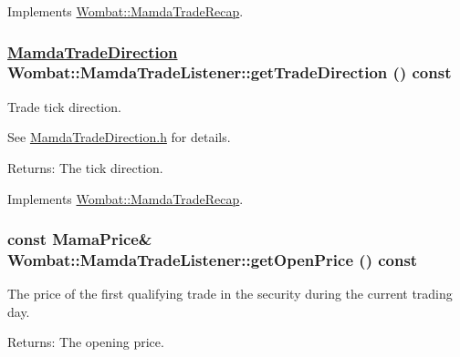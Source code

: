 Implements \hyperlink{classWombat_1_1MamdaTradeRecap_05f9cfbfd50d3783a2d5716064ed7b9f}{Wombat::Mamda\-Trade\-Recap}.\hypertarget{classWombat_1_1MamdaTradeListener_1acaaeffe975eb7f5a9541703ca49f7e}{
\subsubsection[getTradeDirection]{\setlength{\rightskip}{0pt plus 5cm}\hyperlink{namespaceWombat_d2479765bb418204c8ccfd3785d2bdbe}{Mamda\-Trade\-Direction} Wombat::Mamda\-Trade\-Listener::get\-Trade\-Direction () const}}
\label{classWombat_1_1MamdaTradeListener_1acaaeffe975eb7f5a9541703ca49f7e}


Trade tick direction. 

See \hyperlink{MamdaTradeDirection_8h}{Mamda\-Trade\-Direction.h} for details.

\begin{Desc}
\item[Returns:]The tick direction. \end{Desc}


Implements \hyperlink{classWombat_1_1MamdaTradeRecap_abbd87f4ea29275d32a78e20426cafca}{Wombat::Mamda\-Trade\-Recap}.\hypertarget{classWombat_1_1MamdaTradeListener_0960023261509bd4192432edb22059c2}{
\subsubsection[getOpenPrice]{\setlength{\rightskip}{0pt plus 5cm}const Mama\-Price\& Wombat::Mamda\-Trade\-Listener::get\-Open\-Price () const}}
\label{classWombat_1_1MamdaTradeListener_0960023261509bd4192432edb22059c2}


The price of the first qualifying trade in the security during the current trading day. 

\begin{Desc}
\item[Returns:]The opening price. \end{Desc}


